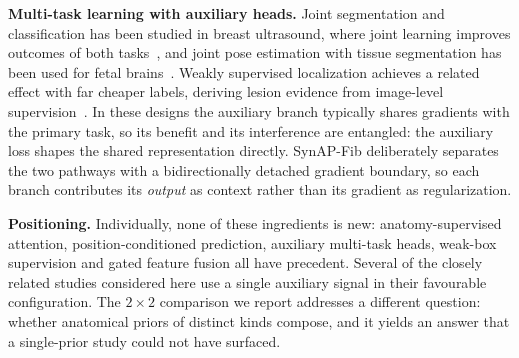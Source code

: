 \textbf{Multi-task learning with auxiliary heads.} Joint segmentation and
classification has been studied in breast ultrasound, where joint learning
improves outcomes of both
tasks~\cite{zhou2020mtlabus,shamtl2021}, and joint pose estimation with
tissue segmentation has been used for fetal
brains~\cite{petsnet2023}. Weakly supervised localization achieves a related
effect with far cheaper labels, deriving lesion evidence from image-level
supervision~\cite{covidweak2020,weakbreast3d2019}. In these designs the
auxiliary branch typically shares gradients with the primary task, so its
benefit and its interference are entangled: the auxiliary loss shapes the shared
representation directly. SynAP-Fib deliberately separates the two pathways with
a bidirectionally detached gradient boundary, so each branch contributes its
\emph{output} as context rather than its gradient as regularization.

\textbf{Positioning.} Individually, none of these ingredients is new:
anatomy-supervised attention, position-conditioned prediction, auxiliary
multi-task heads, weak-box supervision and gated feature fusion all have
precedent. Several of the closely related studies considered here use a
single auxiliary signal in their favourable configuration. The $2\times2$
comparison we report addresses a different question: whether anatomical
priors of distinct kinds compose, and it yields an answer that a
single-prior study could not have surfaced.
